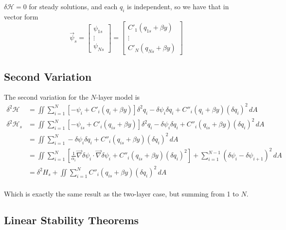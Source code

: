 \documentclass[12pt]{article}
\begin{document}
{{        $\delta \mathcal{H} = 0$ for steady solutions, and each $q_i$ is independent, so we have that in vector form
        \begin{equation}
        \vec \psi_s =
        \left[\begin{array}{c}
        \psi_{1s} \\
        \vdots \\
        \psi_{Ns}
        \end{array}\right]
        =
        \left[\begin{array}{c}
        C'_1(q_{1s} + \beta y) \\
        \vdots \\
        C'_N(q_{Ns} + \beta y)
        \end{array}\right]
        \end{equation}
    }

    \subsection{Second Variation}{
        The second variation for the $N$-layer model is
        \begin{align*}
            \delta^2 \mathcal{H} &= \iint \sum_{i=1}^N \left[ - \psi_i + C'_i(q_i + \beta y) \right]  \delta^2 q_i  - \delta \psi_i \delta q_i +  C''_i(q_i + \beta y) (\delta q_i)^2  \, dA \\
            \delta^2 \mathcal{H}_s &= \iint \sum_{i=1}^N \left[ - \psi_{is} + C'_i(q_{is} + \beta y) \right]  \delta^2 q_i  - \delta \psi_i \delta q_i +  C''_i(q_{is} + \beta y) (\delta q_i)^2  \, dA \\
            &= \iint \sum_{i=1}^N - \delta \psi_i \delta q_i +  C''_i(q_{is} + \beta y) (\delta q_i)^2  \, dA \\
            &= \iint \sum_{i=1}^N \left[ \frac{1}{\alpha_i} \vec\nabla\delta\psi_i \cdot \vec\nabla\delta\psi_i + C''_i(q_{is} + \beta y) (\delta q_i)^2 \right] + \sum_{i=1}^{N-1}(\delta\psi_i - \delta\psi_{i+1})^2 \, dA \\
            &= \delta^2 H_s + \iint \sum_{i=1}^N C''_i(q_{is} + \beta y)(\delta q_i)^2 \, dA \\
        \end{align*}

        Which is exactly the same result as the two-layer case, but summing from 1 to $N$.
    }

    \subsection{Linear Stability Theorems}{
}}
\end{document}
